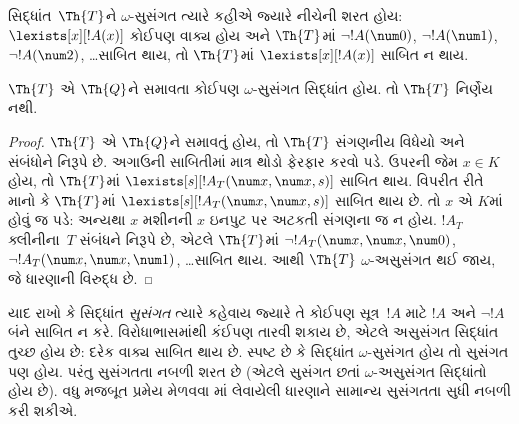 \begin{defn}
સિદ્ધાંત~$\Th{T}$ને
$\omega$-સુસંગત ત્યારે
કહીએ જ્યારે નીચેની શરત હોય:
$\lexists[x][!A(x)]$ કોઈપણ
વાક્ય હોય અને $\Th{T}$માં
$\lnot !A(\num 0)$,
$\lnot !A(\num 1)$,
$\lnot !A(\num 2)$,
\dots સાબિત થાય, તો
$\Th{T}$માં
$\lexists[x][!A(x)]$
સાબિત ન થાય.
\end{defn}

\begin{thm}
  $\Th{T}$ એ $\Th{Q}$ને
  સમાવતા કોઈપણ
  $\omega$-સુસંગત સિદ્ધાંત
  હોય. તો $\Th{T}$
  નિર્ણેય નથી.
\end{thm}

\begin{proof}
$\Th{T}$ એ $\Th{Q}$ને
સમાવતું હોય, તો
$\Th{T}$ સંગણનીય વિધેયો
અને સંબંધોને નિરૂપે છે.
અગાઉની સાબિતીમાં માત્ર
થોડો ફેરફાર કરવો પડે.
ઉપરની જેમ $x \in K$ હોય,
તો $\Th{T}$માં
$\lexists[s][!A_T(\num
  x,\num x, s)]$ સાબિત થાય.
વિપરીત રીતે માનો કે
$\Th{T}$માં
$\lexists[s][!A_T(\num x, \num x, s)]$
સાબિત થાય છે. તો $x$ એ
$K$માં હોવું જ પડે: અન્યથા
$x$ મશીનની $x$ ઇનપુટ
પર અટકતી સંગણના જ ન હોય.
$!A_T$ ક્લીનીના~$T$
સંબંધને નિરૂપે છે, એટલે
$\Th{T}$માં
$\lnot !A_T(\num x, \num x, \num 0)$,
$\lnot !A_T(\num x, \num
x, \num 1)$, \dots સાબિત
થાય. આથી $\Th{T}$
$\omega$-અસુસંગત થઈ જાય,
જે ધારણાની વિરુદ્ધ છે.
\end{proof}
\endgroup


\begingroup
\makeatletter{}\makeatother


\label{guunit:OLP-0305}


\begin{explain}
યાદ રાખો કે સિદ્ધાંત
\emph{સુસંગત} ત્યારે કહેવાય
જ્યારે તે કોઈપણ
સૂત્ર~$!A$ માટે
$!A$ અને $\lnot !A$
બંને સાબિત ન કરે.
વિરોધાભાસમાંથી કંઈપણ તારવી
શકાય છે, એટલે અસુસંગત
સિદ્ધાંત તુચ્છ હોય છે:
દરેક વાક્ય સાબિત થાય છે.
સ્પષ્ટ છે કે સિદ્ધાંત
$\omega$-સુસંગત હોય તો
સુસંગત પણ હોય. પરંતુ
સુસંગતતા નબળી શરત છે
(એટલે સુસંગત છતાં
$\omega$-અસુસંગત સિદ્ધાંતો
હોય છે). વધુ મજબૂત પ્રમેય
મેળવવા
માં
લેવાયેલી ધારણાને સામાન્ય
સુસંગતતા સુધી નબળી કરી
શકીએ.
\end{explain}

